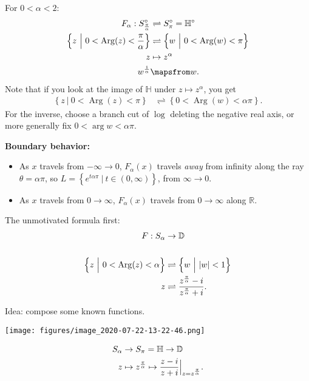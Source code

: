 \begin{proposition}

For \(0 < \alpha < 2\):
\begin{align*}
F_\alpha: S_{\pi \over \alpha }^\circ &\rightleftharpoons S_{\pi}^\circ = {\mathbb{H}}^\circ \\
\left\{{z{~\mathrel{\Big|}~}0 < \operatorname{Arg}(z) < {\pi\over \alpha} }\right\} &\rightleftharpoons\left\{{w{~\mathrel{\Big|}~}0 < \operatorname{Arg}(w) < \pi }\right\} \\
z &\mapsto z^\alpha \\
w^{1\over \alpha} &\mapsfrom w
.\end{align*}
Note that if you look at the image of \({\mathbb{H}}\) under
\(z\mapsto z^{\alpha}\), you get
\begin{align*}
\left\{{z {~\mathrel{\Big|}~}0 < \operatorname{Arg}(z) < \pi }\right\} &\rightleftharpoons\left\{{0 < \operatorname{Arg}(w) < \alpha \pi }\right\} 
.\end{align*}
For the inverse, choose a branch cut of \(\log\) deleting the negative
real axis, or more generally fix \(0 < \arg w < \alpha \pi\).

\textbf{Boundary behavior:}

\begin{itemize}
\tightlist
\item
  As \(x\) travels from \(-\infty\to 0\), \(F_\alpha(x)\) travels
  \emph{away} from infinity along the ray \(\theta = \alpha \pi\), so
  \(L = \left\{{ e^{t \alpha \pi } {~\mathrel{\Big|}~}t\in (0, \infty) }\right\}\),
  from \(\infty\to 0\).
\item
  As \(x\) travels from \(0\to \infty\), \(F_\alpha(x)\) travels from
  \(0\to \infty\) along \({\mathbb{R}}\).
\end{itemize}

\end{proposition}

\begin{proposition}

The unmotivated formula first:
\begin{align*}
F: S_{\alpha} &\to {\mathbb{D}}\\ \\
\left\{{ z {~\mathrel{\Big|}~}0 < \operatorname{Arg}(z) < \alpha }\right\} &\rightleftharpoons\left\{{ w {~\mathrel{\Big|}~}{\left\lvert {w} \right\rvert} < 1 }\right\} \\
z &\rightleftharpoons{z^{\pi\over \alpha} - i \over z^{\pi\over\alpha} + i}
.\end{align*}

Idea: compose some known functions.

\texttt{[image: figures/image\_2020-07-22-13-22-46.png]}

\begin{align*}
S_{\alpha} &\to S_{\pi} = {\mathbb{H}}\to {\mathbb{D}}\\
z &\mapsto z^{\pi \over \alpha} \mapsto {z-i\over z+i}\Big|_{z= z^{\pi\over \alpha}}
.\end{align*}

\end{proposition}

